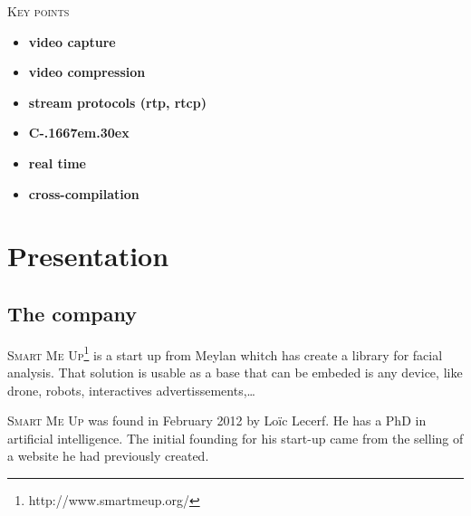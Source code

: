\documentclass[a4paper,11pt]{custom}
\newcommand{\smu}{\textsc{Smart Me Up}}
\newcommand{\cpp}{%
  C\kern-.1667em\raise.30ex\hbox{\smaller{++}\xspace}%
  \spacefactor1000%
}
\begin{document}
\begin{center}
\textsc{\textsc{Key points}}
\end{center}

\begin{multicols}{2}
\begin{itemize}
\item \textbf{video capture}
\item \textbf{video compression}
\item \textbf{stream protocols (rtp, rtcp)}
\item \textbf{\cpp}
\item \textbf{real time}
\item \textbf{cross-compilation}
\end{itemize}
\end{multicols}

\newpage

%
\headerleftcontent{\headerlefttext}%
\headerrightcontent{\headerrighttext}%

\tableofcontents

\clearpage

\chapter{Presentation}


\section{The company}

\smu{}\footnote{http://www.smartmeup.org/} is a start up from Meylan whitch has create a library for facial
analysis. That solution is usable as a base that can be embeded is any device,
like drone, robots, interactives advertissements,…

\smu{} was found in February 2012 by Loïc Lecerf. He has a PhD in artificial
intelligence. The initial founding for his start-up came from the selling of
a website he had previously created.
\end{document}
